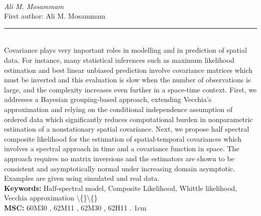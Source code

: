 \documentclass[10pt,twoside]{article}
\begin{document}
\noindent\begin{minipage}[t][\textheight]{\textwidth}
\\[0.35em]
{\itshape Ali M. Mosammam}\\[0.2em]
{\footnotesize First author: Ali M. Mosammam}\\[0.45em]
\noindent\rule{\textwidth}{0.3pt}\\[0.4em]
{\footnotesize  Covariance plays very important roles in modelling and in prediction of spatial data. For instance, many statistical inferences such as maximum likelihood estimation and best linear unbiased prediction involve covariance matrices which must be inverted and this evaluation is slow when the number of observations is large, and the complexity increases even further in a space-time context. First, we addresses a Bayesian grouping-based approach, extending Vecchia's approximation and relying on the conditional independence assumption of ordered data which significantly reduces computational burden in nonparametric estimation of a nonstationary spatial covariance. Next, we propose half spectral composite likelihood for the estimation of spatial-temporal covariances which involves a spectral approach in time and a covariance function in space. The approach requires no matrix inversions and the estimators are shown to be consistent and asymptotically normal under increasing domain asymptotic. Examples are given using simulated and real data.}\\[0.4em]
{\footnotesize\bfseries Keywords:} {\footnotesize Half-spectral model, Composite Likelihood, Whittle likelihood, Vecchia approximation \textbackslash\{\}\textbackslash\{\}}\\[0.15em]
{\footnotesize\bfseries MSC:} {\footnotesize 60M30 , 62M11 , 62M30 , 62H11 . 1cm}\\
\vfill
\end{minipage}
\newpage
\end{document}
